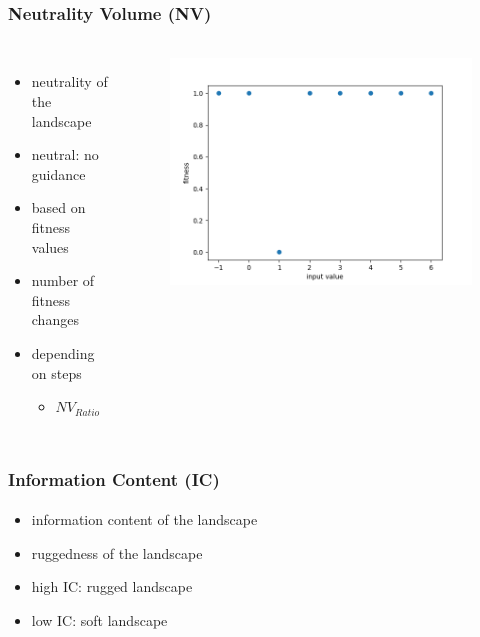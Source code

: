 \begin{frame}
	\frametitle{Neutrality Volume (NV)}
	\framesubtitle{\cite{Albunian.2020}}
	
	\begin{columns}[c]
		
		
		\begin{itemize}
			\item neutrality of the landscape
			\item neutral: no guidance
			\item based on fitness values
			\item number of fitness changes
			\item depending on steps
			\begin{itemize}
				\item $NV_{Ratio}$
			\end{itemize}
		\end{itemize}	
	
		\begin{figure}
			\includegraphics[width=1\textwidth]{figures/plot_no_guidance}
		\end{figure}
		
	\end{columns}	

\end{frame}

\begin{frame}
	\frametitle{Information Content (IC)}
	\framesubtitle{\cite{Vassilev.2000,Albunian.2020}}
	
	\begin{itemize}
		\item information content of the landscape
		\item ruggedness of the landscape
		\item high IC: rugged landscape
		\item low IC: soft landscape
	\end{itemize}
	
\end{frame}